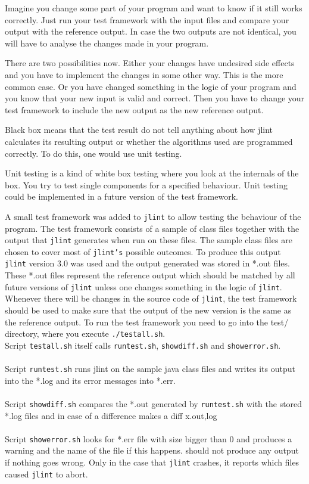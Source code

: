 \documentclass[11pt,twoside,a4paper,draft]{article}
\begin{document}
Imagine you change some part of your program and want to know if it 
still works correctly. Just run your test framework with the input files
and compare your output with the reference output. In case the two
outputs are not identical, you will have to analyse the changes 
made in your program.

There are two possibilities now. Either your changes have undesired
side effects and you have to implement the changes in some other 
way. This is the more common case. Or you have changed something
in the logic of your program and you know that your new input is
valid and correct. Then you have to change your test framework
to include the new output as the new reference output.


Black box means that the test result do not tell anything about how
jlint calculates its resulting output or whether the algorithms used
are programmed correctly. To do this, one would use unit testing.

Unit testing is a kind of white box testing where you look at the internals
of the box. You try to test single components for a
specified behaviour. Unit testing could be implemented in a future version
of the test framework.


A small test framework was added to \texttt{jlint} to allow testing the
behaviour of the program. The test framework consists of a sample of class
files together with the output that \texttt{jlint} generates when run on these
files. The sample class files are chosen to cover most of \texttt{jlint's}
possible outcomes. To produce this output \texttt{jlint} version 3.0 was used
and the output generated was stored in *.out files. These *.out files 
represent the reference output which should be matched by all future versions
of \texttt{jlint} unless one changes something in the logic of \texttt{jlint}.
Whenever there will be changes in the source code of \texttt{jlint}, the test
framework should be used to make sure that the output of the new version is 
the same as the reference output. To run the test framework you need to go
into the test/ directory, where you execute \texttt{./testall.sh}.
\\Script \texttt{testall.sh} itself calls \texttt{runtest.sh}, 
\texttt{show\-diff.sh} and \texttt{showerror.sh}.
\\\\Script \texttt{runtest.sh}
runs jlint on the sample java class files and writes its output into the 
*.log and its error messages into *.err.
\\\\Script \texttt{showdiff.sh}
compares the *.out generated by \texttt{runtest.sh} with the stored *.log
files and in case of a difference makes a diff x.{out,log}
\\\\Script \texttt{showerror.sh}
looks for *.err file with size bigger than 0 and produces a warning and the 
name of the file if this happens.
should not produce any output if nothing goes wrong. Only in the case that 
\texttt{jlint} crashes, it reports which files caused \texttt{jlint} to abort.
\end{document}
